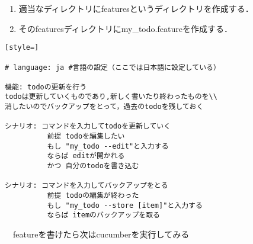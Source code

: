 \begin{enumerate}
\item 適当なディレクトリにfeaturesというディレクトリを作成する．
\item そのfeaturesディレクトリにmy\_todo.featureを作成する．
\end{enumerate}\begin{lstlisting}[style=]

# language: ja #言語の設定（ここでは日本語に設定している）

機能: todoの更新を行う
todoは更新していくものであり,新しく書いたり終わったものを\\
消したいのでバックアップをとって，過去のtodoを残しておく

シナリオ: コマンドを入力してtodoを更新していく
          前提 todoを編集したい
          もし "my_todo --edit"と入力する
          ならば editが開かれる
          かつ 自分のtodoを書き込む

シナリオ: コマンドを入力してバックアップをとる
          前提 todoの編集が終わった
          もし "my_todo --store [item]"と入力する
          ならば itemのバックアップを取る

\end{lstlisting}
　featureを書けたら次はcucumberを実行してみる
